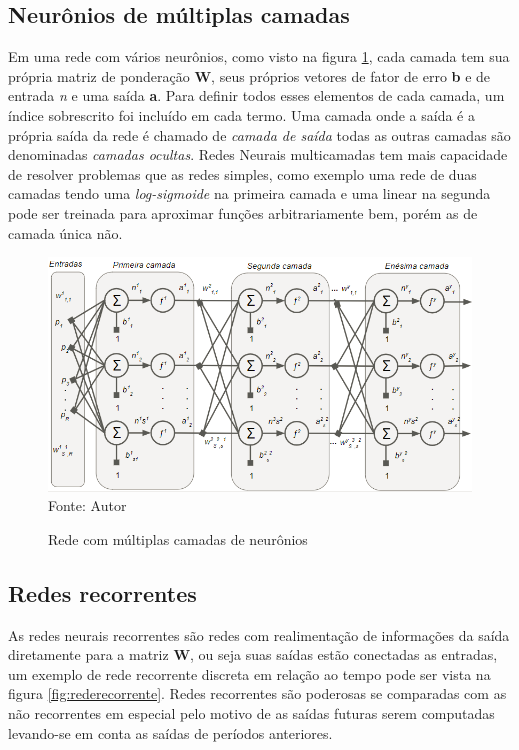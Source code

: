 \documentclass[
	12pt,				%
    oneside,			%
	a4paper,			%
	english,			%
	french,				%
	spanish,			%
	brazil,				%
	]{abntex2}
\begin{document}
\subsection {Neurônios de múltiplas camadas} 

Em uma rede com vários neurônios, como visto na figura \ref{fig:Neuronio_multipla_camada}, cada camada tem sua própria matriz de ponderação \textbf{W}, seus próprios vetores de fator de erro \textbf{b} e de entrada \textit{n} e uma saída \textbf{a}. Para definir todos esses elementos de cada camada, um índice sobrescrito foi incluído em cada termo. Uma camada onde a saída é a própria saída da rede é chamado de \textit{camada de saída} todas as outras camadas são denominadas \textit{camadas ocultas}. 
Redes Neurais multicamadas tem mais capacidade de resolver problemas que as redes simples, como exemplo uma rede de duas camadas tendo uma \textit{log-sigmoide} na primeira camada e uma linear na segunda pode ser treinada para aproximar funções arbitrariamente bem, porém as de camada única não. 

\begin{figure}[H]
    \centering
    \caption{Rede com múltiplas camadas de neurônios}
    \includegraphics[scale=0.65]{neuronio_multi_camada1}\\
    Fonte: Autor\hfill
    \label{fig:Neuronio_multipla_camada}
\end{figure}

\subsection {Redes recorrentes}

As redes neurais recorrentes são redes com realimentação de informações da saída diretamente para a matriz \textbf{W}, ou seja suas saídas estão conectadas as entradas, um exemplo de rede recorrente discreta em relação ao tempo pode ser vista na figura \ref{fig:rederecorrente}. Redes recorrentes são poderosas se comparadas com as não recorrentes em especial pelo motivo de as saídas futuras serem computadas levando-se em conta as saídas de períodos anteriores.
\end{document}
